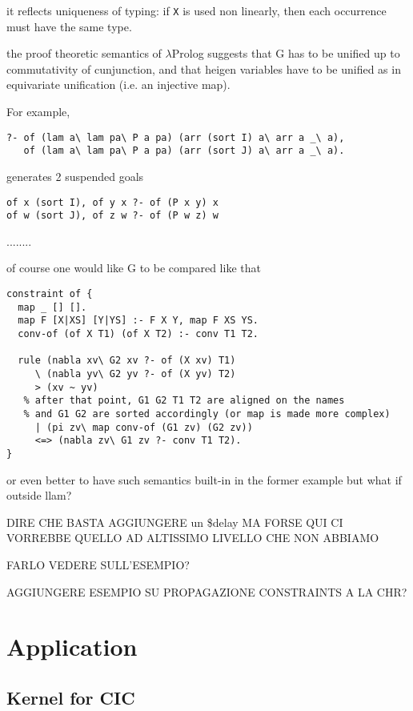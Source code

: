 \documentclass{easychair}
\begin{document}
it reflects uniqueness of typing: if \verb+X+ is used non linearly,
then each occurrence must have the same type.

the proof theoretic semantics of $\lambda$Prolog suggests that G has to be unified
up to commutativity of cunjunction, and that heigen variables have to
be unified as in equivariate unification (i.e. an injective map).

For example,


\begin{verbatim}
?- of (lam a\ lam pa\ P a pa) (arr (sort I) a\ arr a _\ a),
   of (lam a\ lam pa\ P a pa) (arr (sort J) a\ arr a _\ a).
\end{verbatim}

generates 2 suspended goals

\begin{verbatim}
of x (sort I), of y x ?- of (P x y) x
of w (sort J), of z w ?- of (P w z) w
\end{verbatim}

........

of course one would like G to be compared like that

\begin{verbatim}
constraint of {
  map _ [] [].
  map F [X|XS] [Y|YS] :- F X Y, map F XS YS.
  conv-of (of X T1) (of X T2) :- conv T1 T2.

  rule (nabla xv\ G2 xv ?- of (X xv) T1)
     \ (nabla yv\ G2 yv ?- of (X yv) T2)
     > (xv ~ yv)
   % after that point, G1 G2 T1 T2 are aligned on the names
   % and G1 G2 are sorted accordingly (or map is made more complex)
     | (pi zv\ map conv-of (G1 zv) (G2 zv))
     <=> (nabla zv\ G1 zv ?- conv T1 T2).
}
\end{verbatim}

or even better to have such semantics built-in in the former example
but what if outside llam?


DIRE CHE BASTA AGGIUNGERE un \$delay MA FORSE QUI CI VORREBBE QUELLO AD ALTISSIMO LIVELLO CHE NON ABBIAMO

FARLO VEDERE SULL'ESEMPIO?

AGGIUNGERE ESEMPIO SU PROPAGAZIONE CONSTRAINTS A LA CHR?

\section{Application}

\subsection{Kernel for CIC}\label{sec:kernel}
\end{document}

